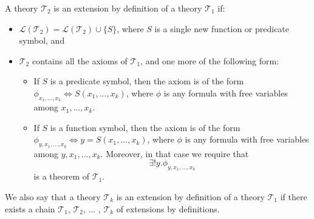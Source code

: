 \begin{defin}
A theory $\mathcal{T}_2$ is an extension by definition of a theory $\mathcal{T}_1$ if:
\begin{itemize}
\item $\mathcal{L}(\mathcal{T}_2) = \mathcal{L}(\mathcal{T}_2) \cup \lbrace S \rbrace$, where $S$ is a single new function or predicate symbol, and
\item $\mathcal{T}_2$ contains all the axioms of $\mathcal{T}_1$, and one more of the following form:
\begin{itemize}
\item If $S$ is a predicate symbol, then the axiom is of the form $\phi_{x_1,...,x_k} \iff S(x_1,...,x_k)$, where $\phi$ is any formula with free variables among $x_1,...,x_k$.
\item If $S$ is a function symbol, then the axiom is of the form $\phi_{y, x_1,...,x_k} \iff y = S(x_1,...,x_k)$, where $\phi$ is any formula with free variables among $y, x_1,...,x_k$.
Moreover, in that case we require that 
$$
\exists ! y. \phi_{y, x_1,...,x_k}
$$
is a theorem of $\mathcal{T}_1$.
\end{itemize}
\end{itemize}
\end{defin}
We also say that a theory $\mathcal{T}_k$ is an extension by definition of a theory $\mathcal{T}_1$ if there exists a chain $\mathcal{T}_1$, $\mathcal{T}_2$, ... , $\mathcal{T}_k$ of extensions by definitions.


